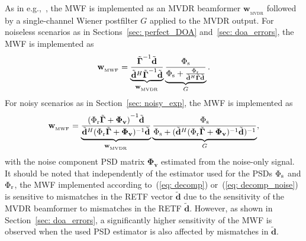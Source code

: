 \documentclass[10pt]{IEEEtran}
\begin{document}
As in e.g.,~\cite{Braun_EUSIPCO_2013,Kuklasinski_EUSIPCO_2014g}, the MWF is implemented as an MVDR beamformer ${\mathbf{w}_{_{\text{MVDR}}}}$ followed by a single-channel Wiener postfilter $G$ applied to the MVDR output.
For noiseless scenarios as in Sections~\ref{sec: perfect_DOA} and~\ref{sec: doa_errors}, the MWF is implemented as
\begin{equation}
\label{eq: decomp}
\mathbf{w}_{_{\text{MWF}}} = \underbrace{\frac{\tilde{\boldsymbol{{\Gamma}}}^{-1}\tilde{\mathbf{d}}}{\tilde{\mathbf{d}}^H\tilde{\boldsymbol{{\Gamma}}}^{-1}\tilde{\mathbf{d}}}}_{\mathbf{w}_{_{\text{MVDR}}}} \underbrace{\frac{\Phi_{\rm s}}{\Phi_{\rm s} + \frac{\Phi_{\rm r}}{\tilde{\mathbf{d}}^H\tilde{\boldsymbol{\Gamma}}\tilde{\mathbf{d}}}}}_{G}.
\end{equation}
For noisy scenarios as in Section~\ref{sec: noisy_exp}, the MWF is implemented as
\begin{equation}
\label{eq: decomp_noise}
\mathbf{w}_{_{\text{MWF}}} = \underbrace{\frac{{{ ( \Phi_{\rm r}\tilde{\boldsymbol{\Gamma}} + \mathbf{\Phi}_{\mathbf{v}} )}}^{-1}\tilde{\mathbf{d}}}{\tilde{\mathbf{d}}^H( \Phi_{\rm r}\tilde{\boldsymbol{\Gamma}} + \mathbf{\Phi}_{\mathbf{v}} )^{-1}\tilde{\mathbf{d}}}}_{\mathbf{w}_{_{\text{MVDR}}}} \underbrace{\frac{\Phi_{\rm s}}{\Phi_{\rm s} + (\tilde{\mathbf{d}}^{H} ( \Phi_{\rm r}\tilde{\boldsymbol{\Gamma}} + \mathbf{\Phi}_{\mathbf{v}} )^{-1}\tilde{\mathbf{d}}  )^{-1}  }}_{G},
\end{equation}
with the noise component PSD matrix $\boldsymbol{\Phi}_{\mathbf{v}}$ estimated from the noise-only signal.
It should be noted that independently of the estimator used for the PSDs $\Phi_{\rm s}$ and $\Phi_{\rm r}$, the MWF implemented according to~(\ref{eq: decomp}) or~(\ref{eq: decomp_noise}) is sensitive to mismatches in the RETF vector $\tilde{\mathbf{d}}$ due to the sensitivity of the MVDR beamformer to mismatches in the RETF $\tilde{\mathbf{d}}$.
However, as shown in Section~\ref{sec: doa_errors}, a significantly higher sensitivity of the MWF is observed when the used PSD estimator is also affected by mismatches in $\tilde{\mathbf{d}}$.
\end{document}
